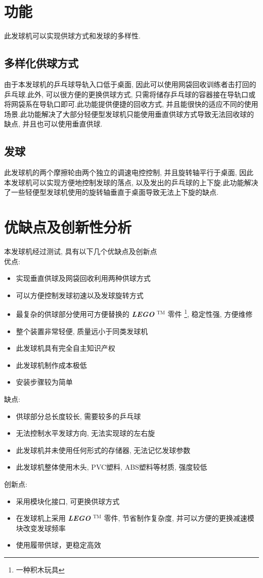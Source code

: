 \documentclass[UTF8]{ctexart}
\begin{document}
\section{\Large 功能}
此发球机可以实现供球方式和发球的多样性.
\subsection{\large 多样化供球方式}
由于本发球机的乒乓球导轨入口低于桌面, 因此可以使用网袋回收训练者击打回的乒乓球.此外, 可以很方便的更换供球方式, 只需将储存乒乓球的容器接在导轨口或将网袋系在导轨口即可.此功能提供便捷的回收方式, 并且能很快的适应不同的使用场景.此功能解决了大部分轻便型发球机只能使用垂直供球方式导致无法回收球的缺点, 并且也可以使用垂直供球.
\subsection{\large 发球}
此发球机的两个摩擦轮由两个独立的调速电控控制, 并且旋转轴平行于桌面, 因此本发球机可以实现方便地控制发球的落点, 以及发出的乒乓球的上下旋.此功能解决了一些轻便型发球机使用的旋转轴垂直于桌面导致无法上下旋的缺点.
\section{\Large 优缺点及创新性分析}
\noindent 本发球机经过测试, 具有以下几个优缺点及创新点\\
\large{优点}:
\begin{itemize}
	\item 实现垂直供球及网袋回收利用两种供球方式
	\item 可以方便控制发球初速以及发球旋转方式
	\item 最复杂的供球部分使用可方便替换的 \textit{\textbf{LEGO}} $ ^\text{TM} $ 零件 \footnote{一种积木玩具}, 稳定性强, 方便维修
	\item 整个装置非常轻便, 质量远小于同类发球机
	\item 此发球机具有完全自主知识产权
	\item 此发球机制作成本极低
	\item 安装步骤较为简单
\end{itemize}
\large{缺点}:
\begin{itemize}
	\item 供球部分总长度较长, 需要较多的乒乓球
	\item 无法控制水平发球方向, 无法实现球的左右旋
	\item 此发球机并未使用任何形式的存储器, 无法记忆发球参数
	\item 此发球机整体使用木头, PVC塑料, ABS塑料等材质, 强度较低
\end{itemize}
\large{创新点}:
\begin{itemize}
	\item 采用模块化接口, 可更换供球方式
	\item 在发球机上采用 \textit{\textbf{LEGO}} $ ^\text{TM} $ 零件, 节省制作复杂度, 并可以方便的更换减速模块改变发球频率
	\item 使用履带供球，更稳定高效
\end{itemize}
\end{document}
